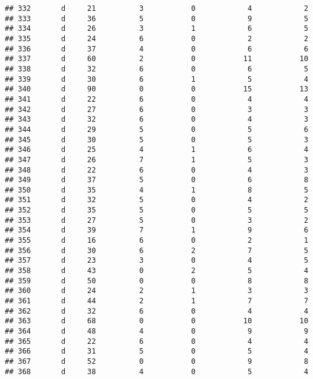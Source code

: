 \documentclass[
]{article}
\begin{document}
\begin{verbatim}
## 332       d     21          3           0            4            2
## 333       d     36          5           0            9            5
## 334       d     26          3           1            6            5
## 335       d     24          6           0            2            2
## 336       d     37          4           0            6            6
## 337       d     60          2           0           11           10
## 338       d     32          6           0            6            5
## 339       d     30          6           1            5            4
## 340       d     90          0           0           15           13
## 341       d     22          6           0            4            4
## 342       d     27          6           0            3            3
## 343       d     32          6           0            4            3
## 344       d     29          5           0            5            6
## 345       d     30          5           0            5            3
## 346       d     25          4           1            6            4
## 347       d     26          7           1            5            3
## 348       d     22          6           0            4            3
## 349       d     37          5           0            6            8
## 350       d     35          4           1            8            5
## 351       d     32          5           0            4            2
## 352       d     35          5           0            5            5
## 353       d     27          5           0            3            2
## 354       d     39          7           1            9            6
## 355       d     16          6           0            2            1
## 356       d     30          6           2            7            5
## 357       d     23          3           0            4            5
## 358       d     43          0           2            5            4
## 359       d     50          0           0            8            8
## 360       d     24          2           1            3            3
## 361       d     44          2           1            7            7
## 362       d     32          6           0            4            4
## 363       d     68          0           0           10           10
## 364       d     48          4           0            9            9
## 365       d     22          6           0            4            4
## 366       d     31          5           0            5            4
## 367       d     52          0           0            9            8
## 368       d     38          4           0            5            4

\end{verbatim}
\end{document}
